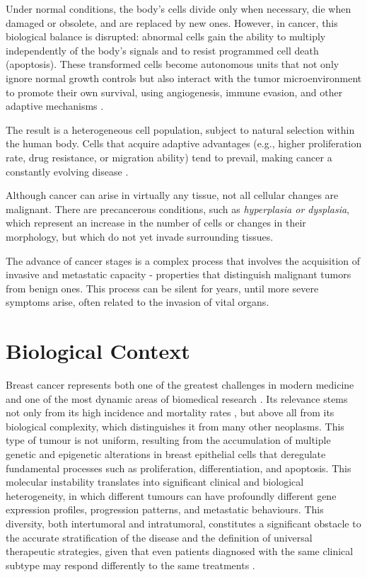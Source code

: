Under normal conditions, the body's cells divide only when necessary, die when
damaged or obsolete, and are replaced by new ones. However, in cancer, this
biological balance is disrupted: abnormal cells gain the ability to multiply
independently of the body's signals and to resist programmed cell death
(apoptosis). These transformed cells become autonomous units that not only
ignore normal growth controls but also interact with the tumor microenvironment
to promote their own survival, using angiogenesis, immune evasion, and other
adaptive mechanisms \cite{def_of_cancer_Brown2023,NCI2021}.

The result is a heterogeneous cell population, subject to natural selection
within the human body. Cells that acquire adaptive advantages (e.g., higher
proliferation rate, drug resistance, or migration ability) tend to prevail,
making cancer a constantly evolving disease \cite{def_of_cancer_Brown2023}.

Although cancer can arise in virtually any tissue, not all cellular changes are
malignant. There are precancerous conditions, such as \textit{hyperplasia or
  dysplasia}, which represent an increase in the number of cells or changes in
their morphology, but which do not yet invade surrounding tissues.

The advance of cancer stages is a complex process that involves the
acquisition of invasive and metastatic capacity - properties that
  distinguish malignant tumors from benign ones. This process can be silent for
years, until more severe symptoms arise, often related to the invasion of vital
organs.

\section{Biological Context}
Breast cancer represents both one of the greatest challenges in modern medicine
and one of the most dynamic areas of biomedical research \cite{bc_molecular_Perou2000}. Its relevance stems
not only from its high incidence and mortality rates \cite{bcaData2024_bray, bca_data_Arnold2022Current}, but above all from its
biological complexity, which distinguishes it from many other neoplasms. This
type of tumour is not uniform, resulting from the accumulation of multiple
genetic and epigenetic alterations in breast epithelial cells that deregulate
fundamental processes such as proliferation, differentiation, and apoptosis.
This molecular instability translates into significant clinical and biological
heterogeneity, in which different tumours can have profoundly different gene
expression profiles, progression patterns, and metastatic behaviours. This
diversity, both intertumoral and intratumoral, constitutes a significant
obstacle to the accurate stratification of the disease and the definition of
universal therapeutic strategies, given that even patients diagnosed with the
same clinical subtype may respond differently to the same treatments \cite{bc_subtypes_Haque2012}.

